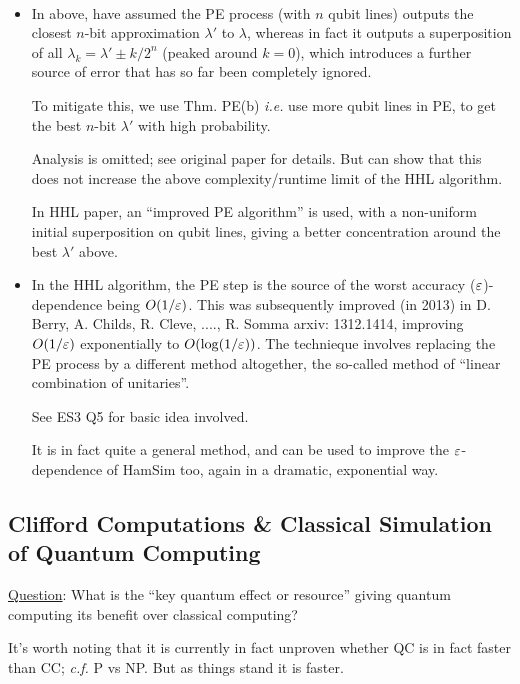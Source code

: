 \documentclass[]{article}
\renewcommand{\it}[1]{\textit{#1}}
\begin{document}
\begin{remark*}\ 
	\begin{itemize}
		\item In above, have assumed the PE process (with $n$ qubit lines) outputs the closest $n$-bit approximation $\lambda'$ to $\lambda$, whereas in fact it outputs a superposition of all $\lambda_k = \lambda' \pm k/2^n$ (peaked around $k = 0$), which introduces a further source of error that has so far been completely ignored.
		
		To mitigate this, we use Thm. PE(b) \it{i.e.} use more qubit lines in PE, to get the best $n$-bit $\lambda'$ with high probability.

		Analysis is omitted; see original paper for details. But can show that this does not increase the above complexity/runtime limit of the HHL algorithm.

		In HHL paper, an ``improved PE algorithm'' is used, with a non-uniform initial superposition on qubit lines, giving a better concentration around the best $\lambda'$ above.

		\item In the HHL algorithm, the PE step is the source of the worst accuracy ($\varepsilon$)-dependence being $O(1/\varepsilon)$. This was subsequently improved (in 2013) in D. Berry, A. Childs, R. Cleve, ...., R. Somma arxiv: 1312.1414, improving $O(1/\varepsilon)$ exponentially to $O(\log(1/\varepsilon))$. The technieque involves replacing the PE process by a different method altogether, the so-called method of ``linear combination of unitaries''.
		
		See ES3 Q5 for basic idea involved.

		It is in fact quite a general method, and can be used to improve the $\varepsilon$-dependence of HamSim too, again in a dramatic, exponential way.
	\end{itemize}
\end{remark*}

\subsection*{Clifford Computations \& Classical Simulation of Quantum Computing}

\underline{Question}: What is the ``key quantum effect or resource'' giving quantum computing its benefit over classical computing?

It's worth noting that it is currently in fact unproven whether QC is in fact faster than CC; \it{c.f.} P vs NP. But as things stand it is faster.
\end{document}
